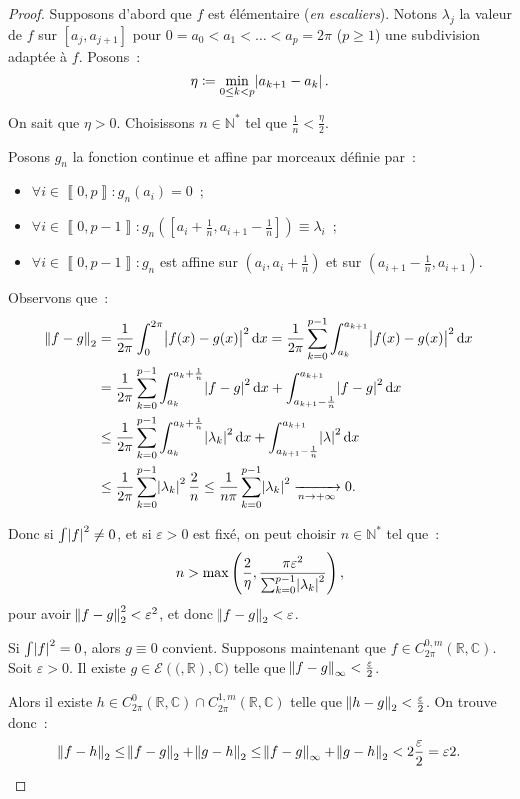 \documentclass{report}
\theoremstyle{definition}
\theoremstyle{remark}
\numberwithin{equation}{section}
\newcommand{\C}{\mathbb C}
\newcommand{\R}{\mathbb R}
\newcommand{\N}{\mathbb N}
\newcommand{\Ns}{\N^{*}}
\newcommand{\El}[2]{\mathcal E\!\left(#1, #2\right)}
\newcommand{\intint}[2]{\left\llbracket#1, #2\right\rrbracket}
\newcommand{\pinfty}{{+\infty}}
\newcommand{\CmT}[2]{C^{#1,m}_{#2}}
\newcommand{\CzmT}[1]{\CmT 0{#1}}
\newcommand{\Czm}{\CzmT{2\pi}}
\begin{document}
			\begin{proof} Supposons d'abord que $f$ est élémentaire (\textit{en escaliers}). Notons $\lambda_j$ la valeur de $f$ sur $[a_j, a_{j+1}]$ pour
			$0 = a_0 < a_1 < \ldots < a_p = 2\pi$ ($p \geq 1$) une subdivision adaptée à $f$. Posons~:
			\begin{equation}
				\eta \coloneqq \min_{0 \leq k < p}\abs {a_{k+1}-a_k}.
			\end{equation}

			On sait que $\eta > 0$. Choisissons $n \in \Ns$ tel que $\frac 1n < \frac \eta2$.

			Posons $g_n$ la fonction continue et affine par morceaux définie par~:
			\begin{itemize}
				\item $\forall i \in \intint 0p : g_n(a_i) = 0$~;
				\item $\forall i \in \intint 0{p-1} : g_n\left([a_i + \frac 1n, a_{i+1} - \frac 1n]\right) \equiv \lambda_i$~;
				\item $\forall i \in \intint 0{p-1} : g_n$ est affine sur $(a_i, a_i+\frac 1n)$ et sur $(a_{i+1}-\frac 1n, a_{i+1})$.
			\end{itemize}

			Observons que~:
			\begin{align}
				\norm {f-g}_2 &= \frac 1{2\pi}\int_0^{2\pi}\abs {f(x)-g(x)}^2\dif x = \frac 1{2\pi}\sum_{k=0}^{p-1}\int_{a_k}^{a_{k+1}}\abs {f(x)-g(x)}^2\dif x \\
				&= \frac 1{2\pi}\sum_{k=0}^{p-1}\int_{a_k}^{a_k+\frac 1n}\abs {f-g}^2\dif x + \int_{a_{k+1}-\frac 1n}^{a_{k+1}}\abs {f-g}^2\dif x \\
				&\leq \frac 1{2\pi}\sum_{k=0}^{p-1}\int_{a_k}^{a_k+\frac 1n}\abs {\lambda_k}^2\dif x + \int_{a_{k+1}-\frac 1n}^{a_{k+1}}\abs {\lambda}^2\dif x \\
				&\leq \frac 1{2\pi}\sum_{k=0}^{p-1}\abs {\lambda_k}^2\frac 2n \leq \frac 1{n\pi}\sum_{k=0}^{p-1}\abs {\lambda_k}^2 \xrightarrow[n \to \pinfty]{} 0.
			\end{align}

			Donc si $\int \abs f^2 \neq 0$, et si $\varepsilon > 0$ est fixé, on peut choisir $n \in \Ns$ tel que~:
			\begin{equation}
				n > \max\left(\frac 2\eta, \frac {\pi\varepsilon^2}{\sum_{k=0}^{p-1}\abs {\lambda_k}^2}\right),
			\end{equation}
			pour avoir $\norm {f-g}_2^2 < \varepsilon^2$, et donc $\norm {f-g}_2 < \varepsilon$.

			Si $\int \abs f^2 = 0$, alors $g \equiv 0$ convient.
			Supposons maintenant que $f \in \Czm(\R, \C)$. Soit $\varepsilon > 0$. Il existe $g \in \El(\R, \C)$ telle que $\norm {f-g}_\infty < \frac \varepsilon2$.

			Alors il existe $h \in C^0_{2\pi}(\R, \C) \cap C^{1,m}_{2\pi}(\R, \C)$ telle que $\norm {h-g}_2 < \frac \varepsilon2$. On trouve donc~:
			\begin{equation}
				\norm {f-h}_2 \leq \norm {f-g}_2 + \norm {g-h}_2 \leq \norm {f-g}_\infty + \norm {g-h}_2 < 2\frac \varepsilon2 = \varepsilon2.
			\end{equation}
			\end{proof}
\end{document}

